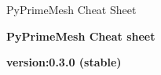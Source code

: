 \documentclass[9pt,landscape]{article}
\begin{document}
\raggedright
\footnotesize

PyPrimeMesh Cheat Sheet

\begin{center}
     \Huge{\textbf{PyPrimeMesh Cheat sheet}} \\
\end{center}
\begin{center}
  \small{\textbf{version:0.3.0 (stable) }} \\
\end{center}
\vspace{-0.15cm}
\noindent\makebox[\linewidth]{\rule{\paperwidth}{2pt}}
\end{document}
